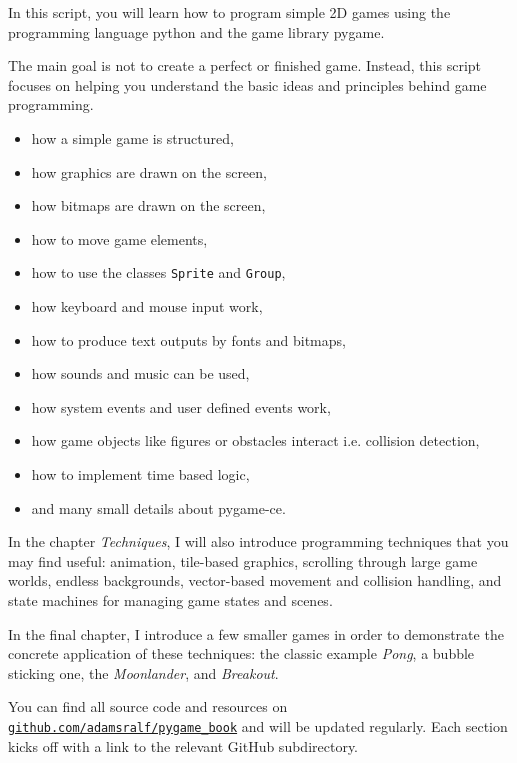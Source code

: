 In this script, you will learn how to program simple 2D games using the programming language \Gls{python} and the game library \Gls{pygame}.

The main goal is not to create a perfect or finished game. Instead, this script focuses on helping you understand the basic ideas and principles behind game programming.

\begin{hintbox}
\begin{itemize}
	\item how a simple game is structured,
	\item how graphics are drawn on the screen,
	\item how bitmaps are drawn on the screen,
	\item how to move game elements,
	\item how to use the classes \texttt{Sprite} and \texttt{Group},
	\item how keyboard and mouse input work,
	\item how to produce text outputs by fonts and bitmaps,
	\item how sounds and music can be used,
	\item how system events and user defined events work,
	\item how game objects like figures or obstacles interact i.e. collision detection,
	\item how to implement time based logic,
	\item and many small details about pygame-ce.
\end{itemize}
\end{hintbox}

In the chapter \emph{Techniques}, I will also introduce programming techniques that you may find useful: animation, tile-based graphics, scrolling through large game worlds, endless backgrounds, vector-based movement and collision handling, and state machines for managing game states and scenes.

In the final chapter, I introduce a few smaller games in order to demonstrate the concrete application of these techniques: the classic example \emph{Pong}, a bubble sticking one, the \emph{Moonlander}, and \emph{Breakout}.

You can find all source code and resources on  \href{https://github.com/adamsralf/pygame_book}{\nolinkurl{github.com/adamsralf/pygame_book}} and will be updated regularly. Each section kicks off with a link to the relevant GitHub subdirectory.

